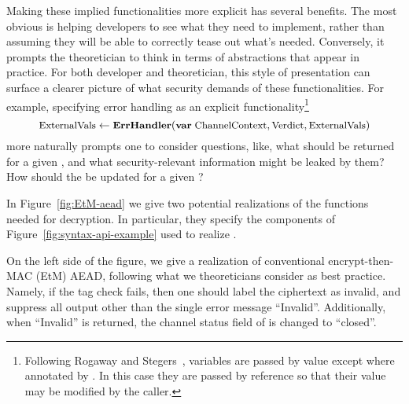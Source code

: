 Making these implied functionalities more explicit has several benefits.  The
most obvious is helping developers to see what they need to implement, rather
than assuming they will be able to correctly tease out what's needed.
Conversely, it prompts the theoretician to think in terms of abstractions that
appear in practice.
%
For both developer and theoretician, this style of presentation can surface a
clearer picture of what security demands of these functionalities. For example,
specifying error handling as an explicit functionality\footnote{Following
Rogaway and Stegers~\cite{RS09}, variables are passed by value except where
annotated by . In this case they are passed by reference so that
their value may be modified by the caller.}
\[
\textrm{\small ExternalVals} \gets
                                  \textrm{\small\bf ErrHandler}(\textrm{\small\bf var}\;
                                  \textrm{\small ChannelContext},
                                  \textrm{\small Verdict}, \textrm{\small ExternalVals})
\]
more naturally prompts one to consider questions, like, what  should
be returned for a given , and what
security-relevant information might be leaked by them?  How should the
 be updated for a given ?

In Figure~\ref{fig:EtM-aead} we give two potential realizations of the
functions needed for decryption. In particular, they specify the components of
Figure~\ref{fig:syntax-api-example} used to realize . 

On the left side of the figure, we give a realization of conventional
encrypt-then-MAC (EtM) AEAD, following what we theoreticians consider as best practice.  Namely, if the tag check fails, then
one should label the ciphertext as invalid, and suppress all output other than
the single error message ``Invalid''.
Additionally, when ``Invalid'' is returned, the channel status field
of  is changed to ``closed''.
%

